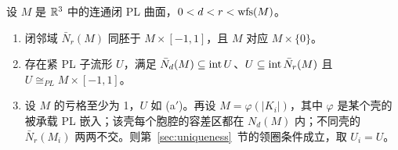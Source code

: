 \begin{lemma}[领圈]\label{lem:collar}
设 $M$ 是 $\mathbb{R}^3$ 中的连通闭 PL 曲面，$0<d<r<\operatorname{wfs}(M)$。
\begin{enumerate}
\item[(a)] 闭邻域 $\bar N_r(M)$ 同胚于 $M\times[-1,1]$，且 $M$ 对应 $M\times\{0\}$。
\item[(a$'$)] 存在紧 PL 子流形 $U$，满足 $\bar N_d(M)\subseteq\operatorname{int} U$、$U\subseteq\operatorname{int}\bar N_r(M)$ 且 $U\cong_{PL}M\times[-1,1]$。
\item[(b)] 设 $M$ 的亏格至少为 1，$U$ 如 (a$'$)。再设 $M=\varphi(|K_i|)$，其中 $\varphi$ 是某个壳的被承载 PL 嵌入；该壳每个胞腔的容差区都在 $N_d(M)$ 内；不同壳的 $\bar N_r(M_i)$ 两两不交。则第~\ref{sec:uniqueness}~节的领圈条件成立，取 $U_i=U$。
\end{enumerate}
\end{lemma}
